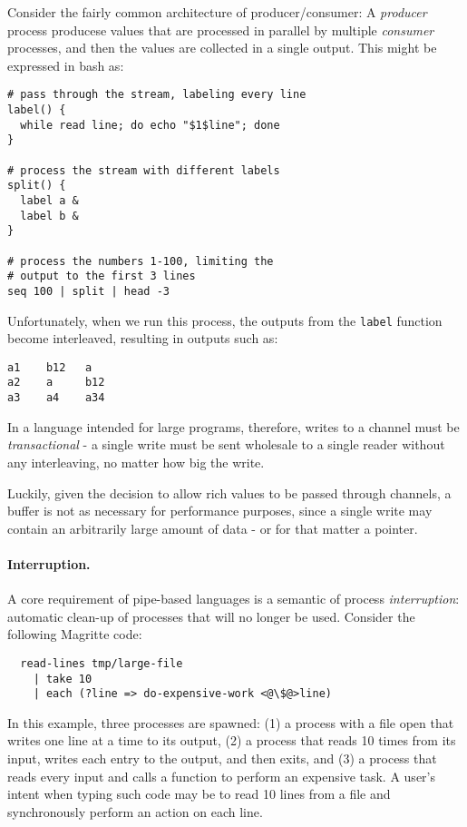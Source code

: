 \documentclass[format=sigconf, review=true, draft=true, screen=true]{acmart}
\begin{document}
Consider the fairly common architecture of producer/consumer: A \emph{producer} process producese values that are processed in parallel by multiple \emph{consumer} processes, and then the values are collected in a single output. This might be expressed in bash as:

\begin{lstlisting}
# pass through the stream, labeling every line
label() {
  while read line; do echo "$1$line"; done
}

# process the stream with different labels
split() {
  label a &
  label b &
}

# process the numbers 1-100, limiting the
# output to the first 3 lines
seq 100 | split | head -3
\end{lstlisting}

Unfortunately, when we run this process, the outputs from the \verb/label/ function become interleaved, resulting in outputs such as:

\begin{verbatim}
a1    b12   a
a2    a     b12
a3    a4    a34
\end{verbatim}
In a language intended for large programs, therefore, writes to a channel must be \emph{transactional} - a single write must be sent wholesale to a single reader without any interleaving, no matter how big the write.

Luckily, given the decision to allow rich values to be passed through channels, a buffer is not as necessary for performance purposes, since a single write may contain an arbitrarily large amount of data - or for that matter a pointer.

\paragraph{Interruption.}
A core requirement of pipe-based languages is a semantic of process \emph{interruption}: automatic clean-up of processes that will no longer be used. Consider the following Magritte code:

\begin{lstlisting}
  read-lines tmp/large-file
    | take 10
    | each (?line => do-expensive-work <@\$@>line)
\end{lstlisting}

In this example, three processes are spawned: (1) a process with a file open that writes one line at a time to its output, (2) a process that reads 10 times from its input, writes each entry to the output, and then exits, and (3) a process that reads every input and calls a function to perform an expensive task.
A user's intent when typing such code may be to read 10 lines from a file and synchronously perform an action on each line.
\end{document}
